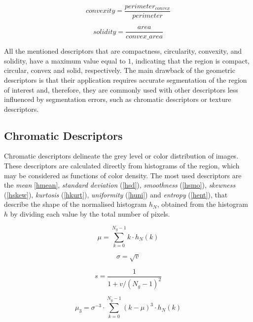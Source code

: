 \begin{equation}\label{convexity}
convexity=\frac{perimeter_{convex}}{perimeter}
\end{equation}

\begin{equation}\label{solidity}
solidity=\frac{area}{convex\_area}
\end{equation}

All the mentioned descriptors that are compactness, circularity, convexity, and solidity, have a maximum value equal to $1$, indicating that the region is compact, circular, convex and solid, respectively.  The main drawback of the geometric descriptors is that their application requires accurate segmentation of the region of interest and, therefore, they are commonly used with other descriptors less influenced by segmentation errors, such as chromatic descriptors or texture descriptors.

\subsection{Chromatic Descriptors} %
Chromatic descriptors delineate the grey level or color distribution of images. These descriptors are calculated directly from histograms of the region, which may be considered as functions of color density. The most used descriptors are the \textit{mean} \ref{hmean},  \textit{standard deviation} (\ref{hsd}), \textit{smoothness} (\ref{hsmo}), \textit{skewness} (\ref{hskew}), \textit{kurtosis} (\ref{hkurt}), \textit{uniformity} (\ref{huni}) and \textit{entropy} (\ref{hent}), that describe the shape of the normalised histogram $h_N$, obtained from the histogram $h$ by dividing each value by the total number of pixels.

\begin{equation}\label{hmean}
\mu=\sum_{k=0}^{N_{g}-1} k\cdot h_N(k)
\end{equation}

\begin{equation}\label{hsd}
\sigma=\sqrt{v}
\end{equation}

\begin{equation}\label{hsmo}
s=\frac{1}{1 + v/(N_{g}-1)^2 }
\end{equation}

\begin{equation}\label{hskew}
\mu_3=\sigma^{-3} \cdot \sum_{k=0}^{N_{g}-1} (k - \mu)^3 \cdot h_N(k)
\end{equation}


